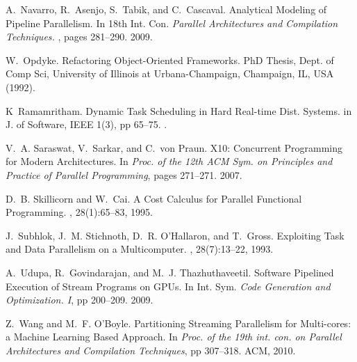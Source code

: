 \documentclass[smallextended]{svjour3}
\begin{document}
\begin{thebibliography}{}
A.~Navarro, R.~Asenjo, S.~Tabik, and C.~Cascaval.
\newblock Analytical Modeling of Pipeline Parallelism.
\newblock In {18th Int. Con. \em Parallel Architectures and Compilation Techniques.
}, pages 281--290. 2009.

W.~Opdyke.
\newblock Refactoring Object-Oriented Frameworks.
\newblock PhD Thesis, Dept. of Comp Sci, University of Illinois at Urbana-Champaign, Champaign, IL, USA (1992).

K~Ramamritham.
\newblock Dynamic Task Scheduling in Hard Real-time Dist. Systems.
\newblock in {J. of Software, IEEE 1(3), pp 65--75}.
.

V.~A. Saraswat, V.~Sarkar, and C.~von Praun.
\newblock X10: Concurrent Programming for Modern Architectures.
\newblock In {\em Proc. of the 12th ACM Sym. on Principles
  and Practice of Parallel Programming}, pages 271--271. 2007.


D.~B. Skillicorn and W.~Cai.
\newblock A {C}ost {C}alculus for {P}arallel {F}unctional {P}rogramming.
, 28(1):65--83, 1995.

J.~Subhlok, J.~M. Stichnoth, D.~R. O'Hallaron, and T.~Gross.
\newblock Exploiting Task and Data Parallelism on a Multicomputer.
, 28(7):13--22, 1993.

A.~Udupa, R.~Govindarajan, and M.~J. Thazhuthaveetil.
\newblock Software Pipelined Execution of Stream Programs on GPUs.
\newblock In {Int. Sym. \em Code Generation and Optimization.
  I}, pp 200--209. 2009.

Z.~Wang and M.~F. O'Boyle.
\newblock Partitioning Streaming Parallelism for Multi-cores: a Machine
  Learning Based Approach.
\newblock In {\em Proc. of the 19th int. con. on Parallel
  Architectures and Compilation Techniques}, pp 307--318. ACM, 2010.

\end{thebibliography}
\end{document}
